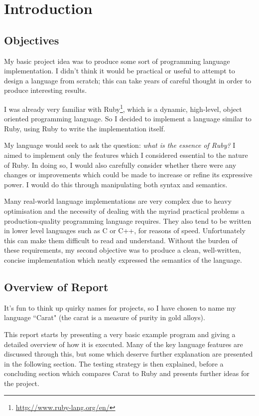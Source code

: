 \section{Introduction}

\subsection{Objectives}

My basic project idea was to produce some sort of programming language implementation. I didn't think it would be practical or useful to attempt to design a language from scratch; this can take years of careful thought in order to produce interesting results.

I was already very familiar with Ruby\footnote{\url{http://www.ruby-lang.org/en/}}, which is a dynamic, high-level, object oriented programming language. So I decided to implement a language similar to Ruby, using Ruby to write the implementation itself.

My language would seek to ask the question: \textit{what is the essence of Ruby?} I aimed to implement only the features which I considered essential to the nature of Ruby. In doing so, I would also carefully consider whether there were any changes or improvements which could be made to increase or refine its expressive power. I would do this through manipulating both syntax and semantics.

Many real-world language implementations are very complex due to heavy optimisation and the necessity of dealing with the myriad practical problems a production-quality programming language requires. They also tend to be written in lower level languages such as C or C++, for reasons of speed. Unfortunately this can make them difficult to read and understand. Without the burden of these requirements, my second objective was to produce a clean, well-written, concise implementation which neatly expressed the semantics of the language.

\subsection{Overview of Report}

It's fun to think up quirky names for projects, so I have chosen to name my language ``Carat" (the carat is a measure of purity in gold alloys).

This report starts by presenting a very basic example program and giving a detailed overview of how it is executed. Many of the key language features are discussed through this, but some which deserve further explanation are presented in the following section. The testing strategy is then explained, before a concluding section which compares Carat to Ruby and presents further ideas for the project.

